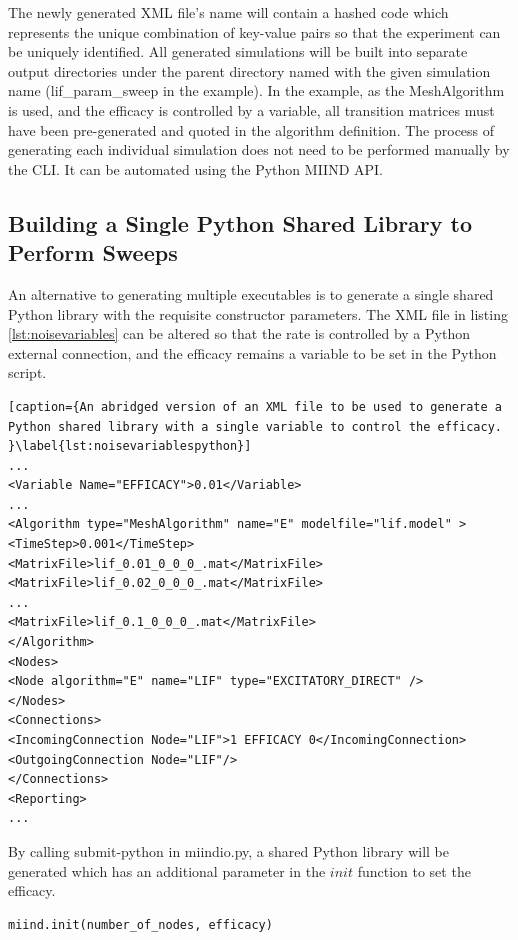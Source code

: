\documentclass[utf8]{frontiers_suppmat} %
\begin{document}
The newly generated XML file's name will contain a hashed code which represents the unique combination of key-value pairs so that the experiment can be uniquely identified. All generated simulations will be built into separate output directories under the parent directory named with the given simulation name (lif\_param\_sweep in the example). In the example, as the MeshAlgorithm is used, and the efficacy is controlled by a variable, all transition matrices must have been pre-generated and quoted in the algorithm definition. The process of generating each individual simulation does not need to be performed manually by the CLI. It can be automated using the Python MIIND API. \\

\subsection{Building a Single Python Shared Library to Perform Sweeps}
An alternative to generating multiple executables is to generate a single shared Python library with the requisite constructor parameters. The XML file in listing \ref{lst:noisevariables} can be altered so that the rate is controlled by a Python external connection, and the efficacy remains a variable to be set in the Python script.

\begin{lstlisting}[caption={An abridged version of an XML file to be used to generate a Python shared library with a single variable to control the efficacy.  }\label{lst:noisevariablespython}]
...
<Variable Name="EFFICACY">0.01</Variable>
...
<Algorithm type="MeshAlgorithm" name="E" modelfile="lif.model" >
<TimeStep>0.001</TimeStep>
<MatrixFile>lif_0.01_0_0_0_.mat</MatrixFile>
<MatrixFile>lif_0.02_0_0_0_.mat</MatrixFile>
...
<MatrixFile>lif_0.1_0_0_0_.mat</MatrixFile>
</Algorithm>
<Nodes>
<Node algorithm="E" name="LIF" type="EXCITATORY_DIRECT" />
</Nodes>
<Connections>
<IncomingConnection Node="LIF">1 EFFICACY 0</IncomingConnection>
<OutgoingConnection Node="LIF"/>
</Connections>
<Reporting>
...
\end{lstlisting}

By calling submit-python in miindio.py, a shared Python library will be generated which has an additional parameter in the $init$ function to set the efficacy.

\begin{lstlisting}
miind.init(number_of_nodes, efficacy)
\end{lstlisting}
\end{document}
